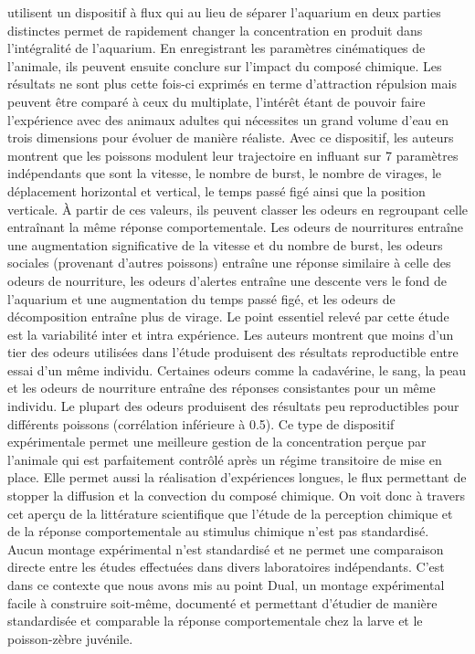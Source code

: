   \cite{kermen2020stimulus} utilisent un dispositif à flux qui au lieu de séparer l'aquarium en deux parties distinctes permet de rapidement changer la concentration en produit dans l'intégralité de l'aquarium. En enregistrant les paramètres cinématiques de l'animale, ils peuvent ensuite conclure sur l'impact du composé chimique. Les résultats ne sont plus cette fois-ci exprimés en terme d'attraction répulsion mais peuvent être comparé à ceux du multiplate, l'intérêt étant de pouvoir faire l'expérience avec des animaux adultes qui nécessites un grand volume d'eau en trois dimensions pour évoluer de manière réaliste. Avec ce dispositif, les auteurs montrent que les poissons modulent leur trajectoire en influant sur 7 paramètres indépendants que sont la vitesse, le nombre de burst, le nombre de virages, le déplacement horizontal et vertical, le temps passé figé ainsi que la position verticale. À partir de ces valeurs, ils peuvent classer les odeurs en regroupant celle entraînant la même réponse comportementale. Les odeurs de nourritures entraîne une augmentation significative de la vitesse et du nombre de burst, les odeurs sociales (provenant d'autres poissons) entraîne une réponse similaire à celle des odeurs de nourriture, les odeurs d'alertes entraîne une descente vers le fond de l'aquarium et une augmentation du temps passé figé, et les odeurs de décomposition entraîne plus de virage.
  Le point essentiel relevé par cette étude est la variabilité inter et intra expérience. Les auteurs montrent que moins d'un tier des odeurs utilisées dans l'étude produisent des résultats reproductible entre essai d'un même individu. Certaines odeurs comme la cadavérine, le sang, la peau et les odeurs de nourriture entraîne des réponses consistantes pour un même individu. Le plupart des odeurs produisent des résultats peu reproductibles pour différents poissons (corrélation inférieure à 0.5). 
  Ce type de dispositif expérimentale permet une meilleure gestion de la concentration perçue par l'animale qui est parfaitement contrôlé après un régime transitoire de mise en place. Elle permet aussi la réalisation d'expériences longues, le flux permettant de stopper la diffusion et la convection du composé chimique.
  \medbreak
  On voit donc à travers cet aperçu de la littérature scientifique que l'étude de la perception chimique et de la réponse comportementale au stimulus chimique n'est pas standardisé. Aucun montage expérimental n'est standardisé et ne permet une comparaison directe entre les études effectuées dans divers laboratoires indépendants. C'est dans ce contexte que nous avons mis au point Dual, un montage expérimental facile à construire soit-même, documenté et permettant d'étudier de manière standardisée et comparable la réponse comportementale chez la larve et le poisson-zèbre juvénile.


